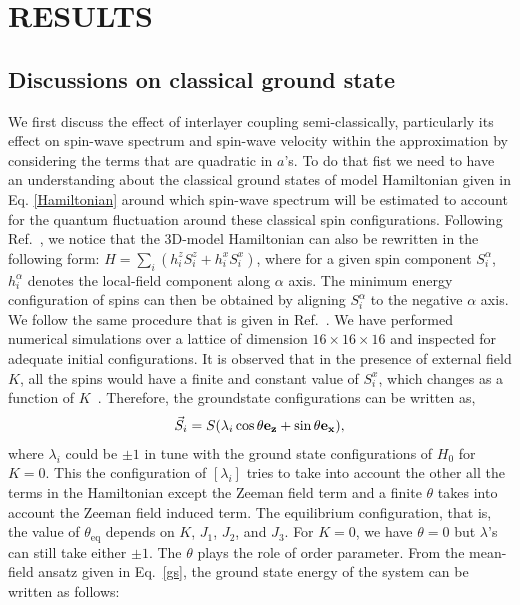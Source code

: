\section{RESULTS}
\label{results}
\subsection{Discussions on classical ground state}
\indent \indent  We first discuss the effect of interlayer coupling semi-classically, particularly its effect on spin-wave spectrum and spin-wave velocity within the approximation by considering the terms that are quadratic in $a$'s. To do that fist we need to have an understanding about the classical ground states of model Hamiltonian given in Eq. \ref{Hamiltonian} around which spin-wave spectrum will be estimated to account for the quantum fluctuation around these classical spin configurations. Following Ref.~\cite{vijigiri2018classical}, we notice that the 3D-model Hamiltonian can also be rewritten in the following form: $H = \sum_i (h^z_i S_i^z + h^x_i S_i^x)$, where for a given spin component $S_i^\alpha$, $h^\alpha_i$ denotes the local-field component along $\alpha$ axis. The minimum energy configuration
of spins can then be obtained by aligning $S_i^\alpha$ to the negative $\alpha$ axis. We follow the same procedure that is given in Ref.~\cite{vijigiri2018classical}. We have performed numerical simulations over a lattice of dimension $16 \times 16 \times 16$ and inspected for adequate initial configurations. It is observed that in the presence of external field $K$,  all the spins would have a finite and constant value of $S_i^x$, which changes as a function
of $K$~\cite{vidal2008perturbative,vijigiri2018classical}. Therefore, the groundstate configurations
can be written as,
\begin{eqnarray}
\label{gs}
\vec{S}_i=S(\lambda_i \cos\theta \bf{e}_z + \sin\theta \bf{e}_x),
\end{eqnarray}
where $\lambda_i$ could be $\pm 1$ in tune with the ground state configurations of $H_0$ for $K=0$.  This  the configuration of $[{\lambda_i}]$ tries to take into account the other all the terms in the Hamiltonian except the Zeeman field term and a finite $\theta $ takes into account the Zeeman field induced term. The equilibrium configuration, that is, the value of $\theta_{\text{eq}}$ depends on $K$, $J_1$, $J_2$, and $J_3$. For $K=0$, we have $\theta=0$ but $\lambda$'s can still take either $\pm 1$. The $\theta$ plays the role of order parameter. From the mean-field ansatz given in Eq.~\eqref{gs}, the ground state energy of the system can be written as follows:
